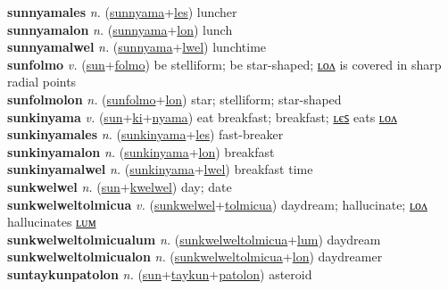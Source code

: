 \textbf{sunnyamales} \textit{n.} (\hyperref[sunnyama]{sunnyama}+\hyperref[les]{les})
luncher \label{sunnyamales} \\
\textbf{sunnyamalon} \textit{n.} (\hyperref[sunnyama]{sunnyama}+\hyperref[lon]{lon})
lunch \label{sunnyamalon} \\
\textbf{sunnyamalwel} \textit{n.} (\hyperref[sunnyama]{sunnyama}+\hyperref[lwel]{lwel})
lunchtime \label{sunnyamalwel} \\
\textbf{sunfolmo} \textit{v.} (\hyperref[sun]{sun}+\hyperref[folmo]{folmo})
be stelliform; be star-shaped; \hyperref[sunfolmolon]{ʟᴏᴧ} is covered in sharp radial points \label{sunfolmo} \\
\textbf{sunfolmolon} \textit{n.} (\hyperref[sunfolmo]{sunfolmo}+\hyperref[lon]{lon})
star; stelliform; star-shaped \label{sunfolmolon} \\
\textbf{sunkinyama} \textit{v.} (\hyperref[sun]{sun}+\hyperref[ki]{ki}+\hyperref[nyama]{nyama})
eat breakfast; breakfast; \hyperref[sunkinyamales]{ʟєꜱ} eats \hyperref[sunkinyamalon]{ʟᴏᴧ} \label{sunkinyama} \\
\textbf{sunkinyamales} \textit{n.} (\hyperref[sunkinyama]{sunkinyama}+\hyperref[les]{les})
fast-breaker \label{sunkinyamales} \\
\textbf{sunkinyamalon} \textit{n.} (\hyperref[sunkinyama]{sunkinyama}+\hyperref[lon]{lon})
breakfast \label{sunkinyamalon} \\
\textbf{sunkinyamalwel} \textit{n.} (\hyperref[sunkinyama]{sunkinyama}+\hyperref[lwel]{lwel})
breakfast time \label{sunkinyamalwel} \\
\textbf{sunkwelwel} \textit{n.} (\hyperref[sun]{sun}+\hyperref[kwelwel]{kwelwel})
day; date \label{sunkwelwel} \\
\textbf{sunkwelweltolmicua} \textit{v.} (\hyperref[sunkwelwel]{sunkwelwel}+\hyperref[tolmicua]{tolmicua})
daydream; hallucinate; \hyperref[sunkwelweltolmicualon]{ʟᴏᴧ} hallucinates \hyperref[sunkwelweltolmicualum]{ʟᴜᴍ} \label{sunkwelweltolmicua} \\
\textbf{sunkwelweltolmicualum} \textit{n.} (\hyperref[sunkwelweltolmicua]{sunkwelweltolmicua}+\hyperref[lum]{lum})
daydream \label{sunkwelweltolmicualum} \\
\textbf{sunkwelweltolmicualon} \textit{n.} (\hyperref[sunkwelweltolmicua]{sunkwelweltolmicua}+\hyperref[lon]{lon})
daydreamer \label{sunkwelweltolmicualon} \\
\textbf{suntaykunpatolon} \textit{n.} (\hyperref[sun]{sun}+\hyperref[taykun]{taykun}+\hyperref[patolon]{patolon})
asteroid \label{suntaykunpatolon} \\
